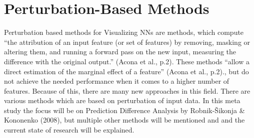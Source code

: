 \section{Perturbation-Based Methods}
Perturbation based methods for Visualizing NNs are methods, which compute “the attribution of an input feature (or set of features) by removing, masking or altering them, and running a forward pass on the new input, measuring the difference with the original output.” (Acona et al., p.2).
These methods “allow a direct estimation of the marginal effect of a feature” (Acona et al., p.2)., but do not achieve the needed performance when it comes to a higher number of features.
Because of this, there are many new approaches in this field.
There are various methods which are based on perturbation of input data. In this meta study the focus will be on Prediction Difference Analysis by Robnik-Šikonja \& Kononenko (2008), but multiple other methods will be mentioned and and the current state of research will be explained.
